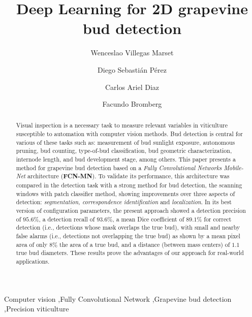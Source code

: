 \documentclass[a4paper,authoryear,review]{elsarticle}
\begin{document}
	
	\begin{frontmatter}
		
		\title{Deep Learning for 2D grapevine bud detection}
		
		\author[utn]{Wenceslao Villegas Marset}
		
		\author[utn,conicet]{Diego Sebastián Pérez}
		
		\author[utn]{Carlos Ariel Diaz}
		
		\author[utn,conicet]{Facundo Bromberg}
		
		\address[utn]{Universidad Tecnológica Nacional.  Dpto. de Sistemas de la Información.  Grupo de Inteligencia Artificial DHARMa, Mendoza, Argentina.}
		
		\address[conicet]{Consejo Nacional de Investigaciones Científicas y Técnicas (CONICET), Argentina.}
		
		
		\begin{abstract}
			Visual inspection is a necessary task to measure relevant variables in viticulture susceptible to automation with computer vision methods. Bud detection is central for various of these tasks such as: measurement of bud sunlight exposure, autonomous pruning, bud counting, type-of-bud classification, bud geometric characterization, internode length, and bud development stage, among others. This paper presents a method for grapevine bud detection based on a \emph{Fully Convolutional Networks Mobile-Net} architecture (\textbf{FCN-MN}). To validate its performance, this architecture was compared in the detection task with a strong  method for bud detection, the scanning windows with patch classifier method, showing improvements over three aspects of detection: \emph{segmentation, correspondence identification} and \emph{localization}. In its best version of configuration parameters, the present approach showed a detection precision of $95.6\%$, a detection recall of $93.6\%$, a mean Dice coefficient of $89.1\%$ for correct detection (i.e., detections whose mask overlaps the true bud), with small and nearby false alarms (i.e., detections not overlapping the true bud) as shown by a mean pixel area of only $8\%$ the area of a true bud,  and a distance (between mass centers) of $1.1$ true bud diameters. These results prove the  advantages of our approach for real-world applications.
		\end{abstract}
		
		\begin{keyword}
			Computer vision \sep Fully Convolutional Network \sep Grapevine bud detection \sep Precision viticulture
		\end{keyword}
	\end{frontmatter}
	
\end{document}
